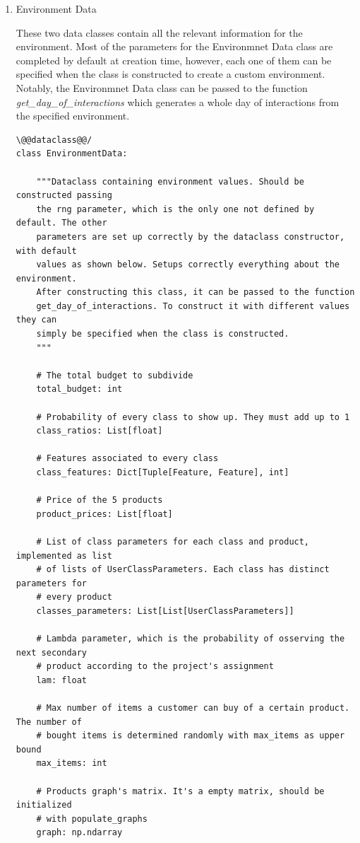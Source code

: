\begin{enumerate}
    \item Environment Data

    These two data classes contain all the relevant information for the environment. Most of the parameters for the Environmnet Data class are completed by default at creation time, however, each one of them can be specified when the class is constructed to create a custom environment. Notably, the Environmnet Data class can be passed to the function \textit{get\_day\_of\_interactions} which generates a whole day of interactions from the specified environment.

    \begin{lstlisting}[style=Python]
\@@dataclass@@/
class EnvironmentData:

    """Dataclass containing environment values. Should be constructed passing
    the rng parameter, which is the only one not defined by default. The other
    parameters are set up correctly by the dataclass constructor, with default
    values as shown below. Setups correctly everything about the environment.
    After constructing this class, it can be passed to the function
    get_day_of_interactions. To construct it with different values they can
    simply be specified when the class is constructed.
    """

    # The total budget to subdivide
    total_budget: int

    # Probability of every class to show up. They must add up to 1
    class_ratios: List[float]

    # Features associated to every class
    class_features: Dict[Tuple[Feature, Feature], int]

    # Price of the 5 products
    product_prices: List[float]

    # List of class parameters for each class and product, implemented as list
    # of lists of UserClassParameters. Each class has distinct parameters for
    # every product
    classes_parameters: List[List[UserClassParameters]]

    # Lambda parameter, which is the probability of osserving the next secondary
    # product according to the project's assignment
    lam: float

    # Max number of items a customer can buy of a certain product. The number of
    # bought items is determined randomly with max_items as upper bound
    max_items: int

    # Products graph's matrix. It's a empty matrix, should be initialized
    # with populate_graphs
    graph: np.ndarray


\end{lstlisting}
\end{enumerate}
